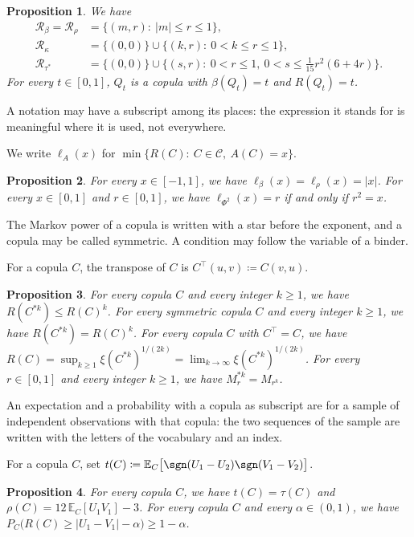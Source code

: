 \documentclass{article}
\newtheorem{proposition}{Proposition}
\newcommand{\CC}{\mathcal{C}}
\begin{document}
\begin{proposition}\label{p17}
We have
\begin{align*}
\mathcal R_\beta=\mathcal R_\rho&=\bigl\{(m,r):\ |m|\le r\le1\bigr\},\\
\mathcal R_\kappa&=\{(0,0)\}\cup\bigl\{(k,r):\ 0<k\le r\le1\bigr\},\\
\mathcal R_{\tau^*}&=\{(0,0)\}\cup\bigl\{(s,r):\ 0<r\le1,\ 0<s\le\tfrac1{15}r^2(6+4r)\bigr\}.
\end{align*}
For every $t\in[0,1]$, $Q_t$ is a copula with $\beta(Q_t)=t$ and $R(Q_t)=t$.
\end{proposition}

A notation may have a subscript among its places: the expression it stands for is
meaningful where it is used, not everywhere.

We write $\ell_A(x)$ for $\min\{R(C):\ C\in\CC,\ A(C)=x\}$.

\begin{proposition}\label{p18}
For every $x\in[-1,1]$, we have $\ell_\beta(x)=\ell_\rho(x)=|x|$.
For every $x\in[0,1]$ and $r\in[0,1]$, we have $\ell_{\Phi^2}(x)=r$ if and only if $r^2=x$.
\end{proposition}

The Markov power of a copula is written with a star before the exponent, and a copula
may be called symmetric. A condition may follow the variable of a binder.

For a copula $C$, the transpose of $C$ is $C^\top(u,v)\coloneqq C(v,u)$.

\begin{proposition}\label{p19}
For every copula $C$ and every integer $k\ge1$, we have $R(C^{\ast k})\le R(C)^k$.
For every symmetric copula $C$ and every integer $k\ge1$, we have $R(C^{\ast k})=R(C)^k$.
For every copula $C$ with $C^\top=C$, we have $R(C)=\sup_{k\ge1}\xi(C^{\ast k})^{1/(2k)}=\lim_{k\to\infty}\xi(C^{\ast k})^{1/(2k)}$.
For every $r\in[0,1]$ and every integer $k\ge1$, we have $M_r^{\ast k}=M_{r^k}$.
\end{proposition}

An expectation and a probability with a copula as subscript are for a sample of
independent observations with that copula: the two sequences of the sample are written
with the letters of the vocabulary and an index.

For a copula $C$, set $t(C)\coloneqq\mathbb{E}_C\bigl[\sgn(U_1-U_2)\sgn(V_1-V_2)\bigr]$.

\begin{proposition}\label{p20}
For every copula $C$, we have $t(C)=\tau(C)$ and $\rho(C)=12\,\mathbb{E}_C[U_1V_1]-3$.
For every copula $C$ and every $\alpha\in(0,1)$, we have $P_C\bigl(R(C)\ge|U_1-V_1|-\alpha\bigr)\ge1-\alpha$.
\end{proposition}
\end{document}
